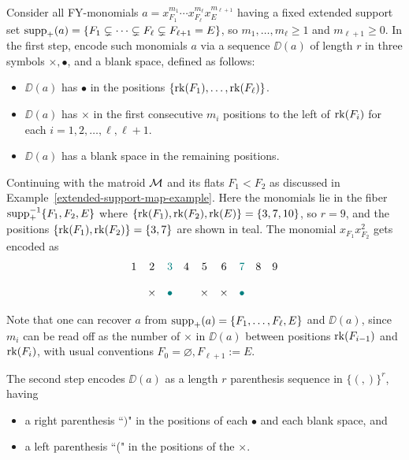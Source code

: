 \begin{defn} \rm
Consider all FY-monomials $a=x_{F_1}^{m_1} \cdots x_{F_\ell}^{m_\ell} x_E^{m_{\ell+1}}$ having a fixed extended support set
$\mathrm{supp}_+(a)=\{F_1 \subsetneq \cdots \subsetneq F_\ell \subsetneq F_{\ell+1}=E\}$, so $m_1,\ldots,m_\ell \geq 1$ and $m_{\ell+1} \geq 0$.  In the first step, encode such monomials
$a$ via
a sequence $\DD(a)$ of length $r$
in three symbols $\times, \bullet$, and a blank space, defined as follows:
\begin{itemize}
    \item $\DD(a)$ has $\bullet$ in the positions $\{\operatorname{\mathrm{rk}}(F_1),\ldots,\operatorname{\mathrm{rk}}(F_\ell)\}$.
\item  $\DD(a)$ has $\times$ in the first consecutive $m_i$ positions to the left of $\operatorname{\mathrm{rk}}(F_i)$ for each $i=1,2,\ldots,\ell,\ell+1$.
\item $\DD(a)$ has a blank space in the remaining positions.
\end{itemize}

\begin{example} \label{dd-example}
\rm Continuing with the matroid $\mathcal{M}$ and its flats $F_1 < F_2$ as discussed in Example~\ref{extended-support-map-example}.  Here the monomials lie in the fiber
$\mathrm{supp}_+^{-1}\{F_1,F_2,E\}$ where 
$\{\operatorname{\mathrm{rk}}(F_1),\operatorname{\mathrm{rk}}(F_2),\operatorname{\mathrm{rk}}(E)\}=\{3,7,10\}$, so $r=9$, and the positions $\{\operatorname{\mathrm{rk}}(F_1),\operatorname{\mathrm{rk}}(F_2)\}=\{3,7\}$ are shown in {\color{teal} teal}. The monomial $x_{F_1} x_{F_2}^2$ gets encoded as
\[\begin{array}{ccccccccc}
     1 & 2 & {\color{teal} 3} & 4 & 5 & 6 & {\color{teal} 7} & 8 & 9  \\ \\
      & \times & {\color{teal} \bullet} &  & \times & \times & {\color{teal} \bullet} &  & 
\end{array}\]

    
\end{example}


\end{defn}

\noindent
Note that one can recover $a$ from 
$
\mathrm{supp}_+(a)=\{F_1,\ldots,F_\ell, E\}
$
and $\DD(a)$, since $m_i$ can be read off as the number of $\times$ in $\DD(a)$ between positions $\operatorname{\mathrm{rk}}(F_{i-1})$ and $\operatorname{\mathrm{rk}}(F_i)$, with usual conventions
$F_0=\varnothing, F_{\ell+1}:=E$.

\begin{defn} \rm
The second step encodes $\DD(a)$ as a length $r$ parenthesis sequence in $\{(,)\}^r$,  having \begin{itemize}
    \item a right parenthesis ``$)$" in the positions of each $\bullet$ and each blank space, and 
    \item a left parenthesis ``(" in the positions of the $\times$.
\end{itemize}

\end{defn}

